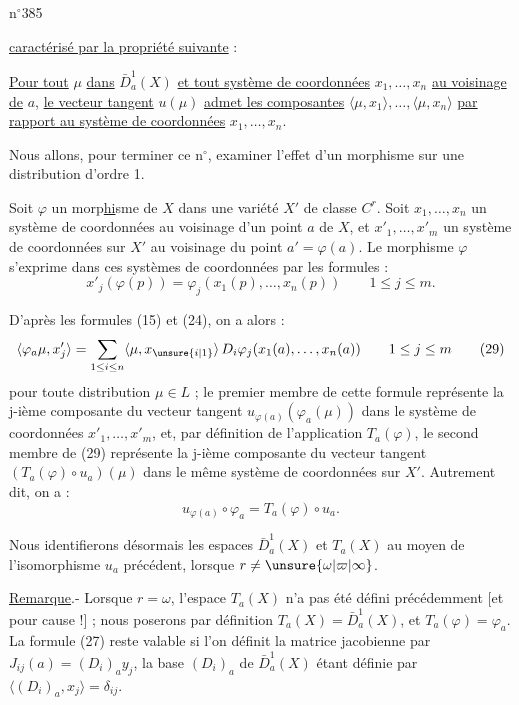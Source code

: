 
n$^{\circ}$385

\uline{caractérisé par la propriété suivante} :

\uline{Pour tout} $\mu$ \uline{dans} $\bar D_a^1(X)$ \uline{et tout système de coordonnées} $x_1,\ldots,x_n$ \uline{au voisinage de} $a$, \uline{le vecteur tangent} $u(\mu)$ \uline{admet les composantes} $\langle\mu,x_1\rangle,\ldots,\langle\mu,x_n\rangle$ \uline{par rapport au système de coordonnées} $x_1,\ldots,x_n$.

Nous allons, pour terminer ce n$^{\circ}$, examiner l'effet d'un morphisme sur une distribution d'ordre 1.

Soit $\varphi$ un morp\uline{hi}sme de $X$ dans une variété $X'$ de classe $C^r$. Soit $x_1,\ldots,x_n$ un système de coordonnées au voisinage d'un point $a$ de $X$, et $x'_1,\ldots,x'_m$ un système de coordonnées sur $X'$ au voisinage du point $a'=\varphi(a)$. Le morphisme $\varphi$ s'exprime dans ces systèmes de coordonnées par les formules :
\[
x'_j(\varphi(p))=\varphi_j(x_1(p),\ldots,x_n(p))\qquad 1\leq j\leq m.\tag*{(28)}
\]

D'après les formules (15) et (24), on a alors :
\[
\langle\varphi_a\mu,x'_j\rangle=\sum_{1\leq i\leq n}\langle\mu,x_{\unsure{i|1}}\rangle\,D_i\varphi_j(x_1(a),\ldots,x_n(a))\qquad 1\leq j\leq m\tag*{(29)}
\]
pour toute distribution $\mu\in L$ ; le premier membre de cette formule représente la j-ième composante du vecteur tangent $u_{\varphi(a)}(\varphi_a(\mu))$ dans le système de coordonnées $x'_1,\ldots,x'_m$, et, par définition de l'application $T_a(\varphi)$, le second membre de (29) représente la j-ième composante du vecteur tangent $(T_a(\varphi)\circ u_a)(\mu)$ dans le même système de coordonnées sur $X'$. Autrement dit, on a :
\[
u_{\varphi(a)}\circ\varphi_a=T_a(\varphi)\circ u_a.\tag*{(30)}
\]

Nous identifierons désormais les espaces $\bar D_a^1(X)$ et $T_a(X)$ au moyen de l'isomorphisme $u_a$ précédent, lorsque $r\ne\unsure{\omega|\varpi|\infty}$.

\uline{Remarque}.- Lorsque $r=\omega$, l'espace $T_a(X)$ n'a pas été défini précédemment [et pour cause !] ; nous poserons par définition $T_a(X)=\bar D_a^1(X)$, et $T_a(\varphi)=\varphi_a$. La formule (27) reste valable si l'on définit la matrice jacobienne par $J_{ij}(a)=(D_i)_a y_j$, la base $(D_i)_a$ de $\bar D_a^1(X)$ étant définie par $\langle(D_i)_a,x_j\rangle=\delta_{ij}$.

